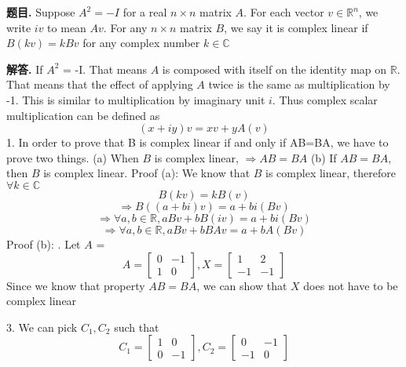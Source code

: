 \documentclass[12pt, a4paper, oneside]{article}
\newcounter{problemname}
\newenvironment{problem}{\begin{shaded}\stepcounter{problemname}\par\noindent\textbf{题目\arabic{problemname}. }}{\end{shaded}\par}
\newenvironment{solution}{\par\noindent\textbf{解答. }}{\par}
\newenvironment{note}{\par\noindent\textbf{题目\arabic{problemname}的注记. }}{\par}
\begin{document}
\begin{CJK}{UTF8}{gbsn}

\begin{problem}
  Suppose $A^2 = -I$ for a real $n \times n$ matrix $A$. For each vector $v \in \mathbb{R}^n$, we write $iv$ to mean $Av$. 
  For any $n \times n$ matrix $B$, we say it is complex linear if $B(kv)=kBv$ for any complex number $k\in \mathbb{C}$
\end{problem}

\begin{solution}
  If $A^2$ = -I. That means $A$ is composed with itself on the identity map on $\mathbb{R}$. That means that the effect of applying
  $A$ twice is the same as multiplication by -1. This is similar to multiplication by imaginary unit $i$.
  Thus complex scalar multiplication can be defined as 
  $$ (x + iy)v = xv + yA(v) $$ 
  1. In order to prove that B is complex linear if and only if AB=BA, we have to prove two things. \newline
  (a) When $B$ is complex linear, $\Rightarrow AB=BA$ \newline
  (b) If $AB=BA$, then $B$ is complex linear. \newline
  Proof (a): We know that $B$ is complex linear, therefore $\forall k \in \mathbb{C}$ 
  $$ B(kv) = kB(v) $$
  $$ \Rightarrow B((a+bi)v) = a+bi(Bv) $$
  $$ \Rightarrow \forall a,b \in \mathbb{R}, aBv + bB(iv) = a + bi(Bv)$$ 
  $$ \Rightarrow \forall a,b \in \mathbb{R}, aBv + bBAv = a + bA(Bv)$$
  Proof (b): . Let $A$ = 
  $$ A = \begin{bmatrix}
    0 & -1 \\ 1 & 0 
  \end{bmatrix}, X = \begin{bmatrix}
    1 & 2 \\ -1 & -1
  \end{bmatrix}$$ 
  Since we know that property $AB=BA$, we can show that $X$ does not have to be complex linear

  3. We can pick $C_1, C_2$ such that
  $$ C_1 = \begin{bmatrix}
    1 & 0 \\ 0 & -1
  \end{bmatrix},  C_2 = \begin{bmatrix}
    0 & -1 \\ -1 & 0
  \end{bmatrix}
  $$
 

\end{solution}
\end{CJK}
\end{document}
